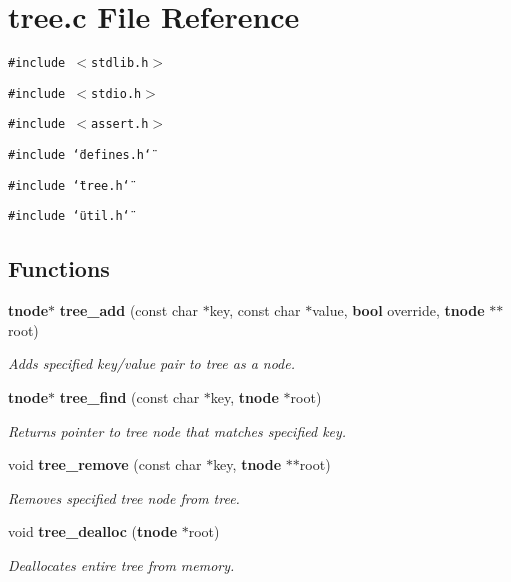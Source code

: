 \section{tree.c File Reference}
\label{tree_8c}
{\tt \#include $<$stdlib.h$>$}\par
{\tt \#include $<$stdio.h$>$}\par
{\tt \#include $<$assert.h$>$}\par
{\tt \#include \char`\"{}defines.h\char`\"{}}\par
{\tt \#include \char`\"{}tree.h\char`\"{}}\par
{\tt \#include \char`\"{}util.h\char`\"{}}\par
\subsection*{Functions}
\begin{CompactItemize}
\item 
{\bf tnode}$\ast$ {\bf tree\_\-add} (const char $\ast$key, const char $\ast$value, {\bf bool} override, {\bf tnode} $\ast$$\ast$root)
\begin{CompactList}\small\item\em Adds specified key/value pair to tree as a node.\item\end{CompactList}\item 
{\bf tnode}$\ast$ {\bf tree\_\-find} (const char $\ast$key, {\bf tnode} $\ast$root)
\begin{CompactList}\small\item\em Returns pointer to tree node that matches specified key.\item\end{CompactList}\item 
void {\bf tree\_\-remove} (const char $\ast$key, {\bf tnode} $\ast$$\ast$root)
\begin{CompactList}\small\item\em Removes specified tree node from tree.\item\end{CompactList}\item 
void {\bf tree\_\-dealloc} ({\bf tnode} $\ast$root)
\begin{CompactList}\small\item\em Deallocates entire tree from memory.\item\end{CompactList}\end{CompactItemize}


